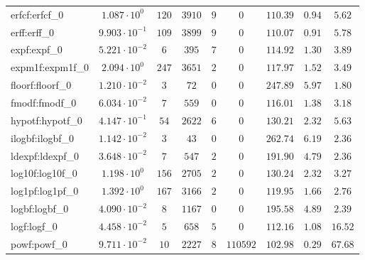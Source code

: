 \begin{tabular}{|l|c|c|c|c|c|c|c|c|}
erfcf:erfcf\_0               & $ 1.087 \cdot 10^{0}  $ & $ 120    $ & $ 3910   $ & $ 9   $ & $ 0      $ & $ 110.39      $ & $ 0.94    $ & $ 5.62    $ \\
erff:erff\_0                 & $ 9.903 \cdot 10^{-1} $ & $ 109    $ & $ 3899   $ & $ 9   $ & $ 0      $ & $ 110.07      $ & $ 0.91    $ & $ 5.78    $ \\
expf:expf\_0                 & $ 5.221 \cdot 10^{-2} $ & $ 6      $ & $ 395    $ & $ 7   $ & $ 0      $ & $ 114.92      $ & $ 1.30    $ & $ 3.89    $ \\
expm1f:expm1f\_0             & $ 2.094 \cdot 10^{0}  $ & $ 247    $ & $ 3651   $ & $ 2   $ & $ 0      $ & $ 117.97      $ & $ 1.52    $ & $ 3.49    $ \\
floorf:floorf\_0             & $ 1.210 \cdot 10^{-2} $ & $ 3      $ & $ 72     $ & $ 0   $ & $ 0      $ & $ 247.89      $ & $ 5.97    $ & $ 1.80    $ \\
fmodf:fmodf\_0               & $ 6.034 \cdot 10^{-2} $ & $ 7      $ & $ 559    $ & $ 0   $ & $ 0      $ & $ 116.01      $ & $ 1.38    $ & $ 3.18    $ \\
hypotf:hypotf\_0             & $ 4.147 \cdot 10^{-1} $ & $ 54     $ & $ 2622   $ & $ 6   $ & $ 0      $ & $ 130.21      $ & $ 2.32    $ & $ 5.63    $ \\
ilogbf:ilogbf\_0             & $ 1.142 \cdot 10^{-2} $ & $ 3      $ & $ 43     $ & $ 0   $ & $ 0      $ & $ 262.74      $ & $ 6.19    $ & $ 2.36    $ \\
ldexpf:ldexpf\_0             & $ 3.648 \cdot 10^{-2} $ & $ 7      $ & $ 547    $ & $ 2   $ & $ 0      $ & $ 191.90      $ & $ 4.79    $ & $ 2.36    $ \\
log10f:log10f\_0             & $ 1.198 \cdot 10^{0}  $ & $ 156    $ & $ 2705   $ & $ 2   $ & $ 0      $ & $ 130.24      $ & $ 2.32    $ & $ 3.27    $ \\
log1pf:log1pf\_0             & $ 1.392 \cdot 10^{0}  $ & $ 167    $ & $ 3166   $ & $ 2   $ & $ 0      $ & $ 119.95      $ & $ 1.66    $ & $ 2.76    $ \\
logbf:logbf\_0               & $ 4.090 \cdot 10^{-2} $ & $ 8      $ & $ 1167   $ & $ 0   $ & $ 0      $ & $ 195.58      $ & $ 4.89    $ & $ 2.39    $ \\
logf:logf\_0                 & $ 4.458 \cdot 10^{-2} $ & $ 5      $ & $ 658    $ & $ 5   $ & $ 0      $ & $ 112.16      $ & $ 1.08    $ & $ 16.52   $ \\
powf:powf\_0                 & $ 9.711 \cdot 10^{-2} $ & $ 10     $ & $ 2227   $ & $ 8   $ & $ 110592 $ & $ 102.98      $ & $ 0.29    $ & $ 67.68   $ \\

\end{tabular}
